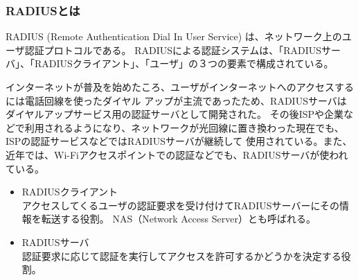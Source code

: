 \documentclass[11pt,a4j,titlepage]{jreport}
\begin{document}
\subsubsection*{RADIUSとは}
RADIUS (Remote Authentication Dial In User Service) \cite{RFC2865}は、ネットワーク上のユーザ認証プロトコルである。
RADIUSによる認証システムは、「RADIUSサーバ」、「RADIUSクライアント」、「ユーザ」の３つの要素で構成されている。

インターネットが普及を始めたころ、ユーザがインターネットへのアクセスするには電話回線を使ったダイヤル
アップが主流であったため、RADIUSサーバはダイヤルアップサービス用の認証サーバとして開発された。
その後ISPや企業などで利用されるようになり、ネットワークが光回線に置き換わった現在でも、ISPの認証サービスなどではRADIUSサーバが継続して
使用されている。また、近年では、Wi-Fiアクセスポイントでの認証などでも、RADIUSサーバが使われている。

\begin{itemize}
    \setlength{\parskip}{0.05cm} %
    \setlength{\itemsep}{0.05cm} 
    \item RADIUSクライアント\mbox{}\\
    アクセスしてくるユーザの認証要求を受け付けてRADIUSサーバーにその情報を転送する役割。
    NAS（Network Access Server）とも呼ばれる。
    \item RADIUSサーバ\mbox{}\\
    認証要求に応じて認証を実行してアクセスを許可するかどうかを決定する役割。
\end{itemize}
\end{document}
